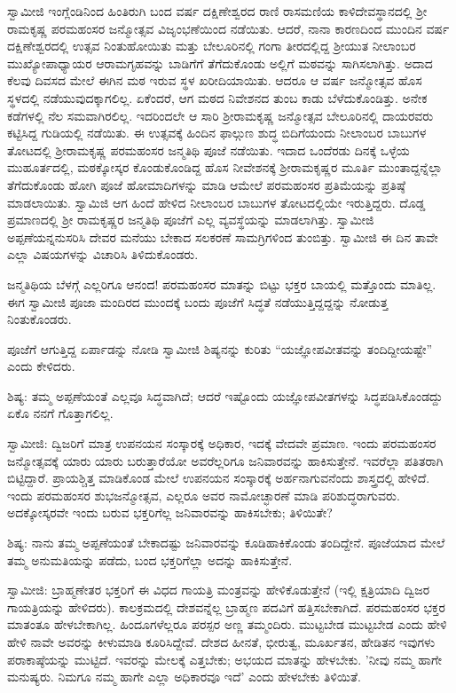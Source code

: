 ಸ್ವಾಮೀಜಿ ಇಂಗ್ಲೆಂಡಿನಿಂದ ಹಿಂತಿರುಗಿ ಬಂದ ವರ್ಷ ದಕ್ಷಿಣೇಶ್ವರದ ರಾಣಿ ರಾಸಮಣಿಯ ಕಾಳಿದೇವಸ್ಥಾನದಲ್ಲಿ ಶ‍್ರೀ ರಾಮಕೃಷ್ಣ ಪರಮಹಂಸರ ಜನ್ಮೋತ್ಸವ ವಿಜೃಂಭಣೆಯಿಂದ ನಡೆಯಿತು. ಆದರೆ, ನಾನಾ ಕಾರಣದಿಂದ ಮುಂದಿನ ವರ್ಷ ದಕ್ಷಿಣೇಶ್ವರದಲ್ಲಿ ಉತ್ಸವ ನಿಂತುಹೋಯಿತು ಮತ್ತು ಬೇಲೂರಿನಲ್ಲಿ ಗಂಗಾ ತೀರದಲ್ಲಿದ್ದ ಶ‍್ರೀಯುತ ನೀಲಾಂಬರ ಮುಖ್ಯೋಪಾಧ್ಯಾಯರ ಆರಾಮಗೃಹವನ್ನು ಬಾಡಿಗೆಗೆ ತೆಗೆದುಕೊಂಡು ಅಲ್ಲಿಗೆ ಮಠವನ್ನು ಸಾಗಿಸಲಾಗಿತ್ತು. ಅದಾದ ಕೆಲವು ದಿವಸದ ಮೇಲೆ ಈಗಿನ ಮಠ ಇರುವ ಸ್ಥಳ ಖರೀದಿಯಾಯಿತು. ಆದರೂ ಆ ವರ್ಷ ಜನ್ಮೋತ್ಸವ ಹೊಸ ಸ್ಥಳದಲ್ಲಿ ನಡೆಯುವುದಕ್ಕಾಗಲಿಲ್ಲ. ಏಕೆಂದರೆ, ಆಗ ಮಠದ ನಿವೇಶನದ ತುಂಬ ಕಾಡು ಬೆಳೆದುಕೊಂಡಿತ್ತು. ಅನೇಕ ಕಡೆಗಳಲ್ಲಿ ನೆಲ ಸಮವಾಗಿರಲಿಲ್ಲ. ಇದರಿಂದಲೇ ಆ ಸಾರಿ ಶ‍್ರೀರಾಮಕೃಷ್ಣ ಜನ್ಮೋತ್ಸವ ಬೇಲೂರಿನಲ್ಲಿ ದಾಯರವರು ಕಟ್ಟಿಸಿದ್ದ ಗುಡಿಯಲ್ಲಿ ನಡೆಯಿತು. ಈ ಉತ್ಸವಕ್ಕೆ ಹಿಂದಿನ ಫಾಲ್ಗುಣ ಶುದ್ಧ ಬಿದಿಗೆಯಂದು ನೀಲಾಂಬರ ಬಾಬುಗಳ ತೋಟದಲ್ಲಿ ಶ‍್ರೀರಾಮಕೃಷ್ಣ ಪರಮಹಂಸರ ಜನ್ಮತಿಥಿ ಪೂಜೆ ನಡೆಯಿತು. ಇದಾದ ಒಂದೆರಡು ದಿನಕ್ಕೆ ಒಳ್ಳೆಯ ಮುಹೂರ್ತದಲ್ಲಿ, ಮಠಕ್ಕೋಸ್ಕರ ಕೊಂಡುಕೊಂಡಿದ್ದ ಹೊಸ ನೀವೇಶನಕ್ಕೆ ಶ‍್ರೀರಾಮಕೃಷ್ಣರ ಮೂರ್ತಿ ಮುಂತಾದ್ದನ್ನೆಲ್ಲಾ ತೆಗೆದುಕೊಂಡು ಹೋಗಿ ಪೂಜೆ ಹೋಮಾದಿಗಳನ್ನು ಮಾಡಿ ಆಮೇಲೆ ಪರಮಹಂಸರ ಪ್ರತಿಮೆಯನ್ನು ಪ್ರತಿಷ್ಠೆ ಮಾಡಲಾಯಿತು. ಸ್ವಾಮಿಜಿ ಆಗ ಹಿಂದೆ ಹೇಳಿದ ನೀಲಾಂಬರ ಬಾಬುಗಳ ತೋಟದಲ್ಲಿಯೇ ಇರುತ್ತಿದ್ದರು. ದೊಡ್ಡ ಪ್ರಮಾಣದಲ್ಲಿ ಶ‍್ರೀ ರಾಮಕೃಷ್ಣರ ಜನ್ಮತಿಥಿ ಪೂಜೆಗೆ ಎಲ್ಲ ವ್ಯವಸ್ಥೆಯನ್ನು ಮಾಡಲಾಗಿತ್ತು. ಸ್ವಾಮೀಜಿ ಅಪ್ಪಣೆಯನ್ನನುಸರಿಸಿ ದೇವರ ಮನೆಯು ಬೇಕಾದ ಸಲಕರಣೆ ಸಾಮಗ್ರಿಗಳಿಂದ ತುಂಬಿತ್ತು. ಸ್ವಾಮೀಜಿ ಈ ದಿನ ತಾವೇ ಎಲ್ಲಾ ವಿಷಯಗಳನ್ನು ವಿಚಾರಿಸಿ ತಿಳಿದುಕೊಂಡರು.

ಜನ್ಮತಿಥಿಯ ಬೆಳಗ್ಗೆ ಎಲ್ಲರಿಗೂ ಆನಂದ! ಪರಮಹಂಸರ ಮಾತನ್ನು ಬಿಟ್ಟು ಭಕ್ತರ ಬಾಯಲ್ಲಿ ಮತ್ತೊಂದು ಮಾತಿಲ್ಲ. ಈಗ ಸ್ವಾಮೀಜಿ ಪೂಜಾ ಮಂದಿರದ ಮುಂದಕ್ಕೆ ಬಂದು ಪೂಜೆಗೆ ಸಿದ್ಧತೆ ನಡೆಯುತ್ತಿದ್ದದ್ದನ್ನು ನೋಡುತ್ತ ನಿಂತುಕೊಂಡರು.

ಪೂಜೆಗೆ ಆಗುತ್ತಿದ್ದ ಏರ್ಪಾಡನ್ನು ನೋಡಿ ಸ್ವಾಮೀಜಿ ಶಿಷ್ಯನನ್ನು ಕುರಿತು “ಯಜ್ಞೋಪವೀತವನ್ನು ತಂದಿದ್ದೀಯಷ್ಟೇ” ಎಂದು ಕೇಳಿದರು.

ಶಿಷ್ಯ: ತಮ್ಮ ಅಪ್ಪಣೆಯಂತೆ ಎಲ್ಲವೂ ಸಿದ್ಧವಾಗಿದೆ; ಆದರೆ ಇಷ್ಟೊಂದು ಯಜ್ಞೋಪವೀತಗಳನ್ನು ಸಿದ್ಧಪಡಿಸಿಕೊಂಡದ್ದು ಏಕೊ ನನಗೆ ಗೊತ್ತಾಗಲಿಲ್ಲ.

ಸ್ವಾಮೀಜಿ: ದ್ವಿಜರಿಗೆ ಮಾತ್ರ ಉಪನಯನ ಸಂಸ್ಕಾರಕ್ಕೆ ಅಧಿಕಾರ, ಇದಕ್ಕೆ ವೇದವೇ ಪ್ರಮಾಣ. ಇಂದು ಪರಮಹಂಸರ ಜನ್ಮೋತ್ಸವಕ್ಕೆ ಯಾರು ಯಾರು ಬರುತ್ತಾರೆಯೋ ಅವರೆಲ್ಲರಿಗೂ ಜನಿವಾರವನ್ನು ಹಾಕಿಸುತ್ತೇನೆ. ಇವರೆಲ್ಲಾ ಪತಿತರಾಗಿ ಬಿಟ್ಟಿದ್ದಾರೆ. ಪ್ರಾಯಶ್ಚಿತ್ತ ಮಾಡಿಕೊಂಡ ಮೇಲೆ ಉಪನಯನ ಸಂಸ್ಕಾರಕ್ಕೆ ಅರ್ಹನಾಗುವನೆಂದು ಶಾಸ್ತ್ರದಲ್ಲಿ ಹೇಳಿದೆ. ಇಂದು ಪರಮಹಂಸರ ಶುಭಜನ್ಮೋತ್ಸವ, ಎಲ್ಲರೂ ಅವರ ನಾಮೋಚ್ಛಾರಣೆ ಮಾಡಿ ಪರಿಶುದ್ಧರಾಗುವರು. ಅದಕ್ಕೋಸ್ಕರವೇ ಇಂದು ಬರುವ ಭಕ್ತರಿಗೆಲ್ಲ ಜನಿವಾರವನ್ನು ಹಾಕಿಸಬೇಕು; ತಿಳಿಯಿತೇ?

ಶಿಷ್ಯ: ನಾನು ತಮ್ಮ ಅಪ್ಪಣೆಯಂತೆ ಬೇಕಾದಷ್ಟು ಜನಿವಾರವನ್ನು ಕೂಡಿಹಾಕಿಕೊಂಡು ತಂದಿದ್ದೇನೆ. ಪೂಜೆಯಾದ ಮೇಲೆ ತಮ್ಮ ಅನುಮತಿಯನ್ನು ಪಡೆದು, ಬಂದ ಭಕ್ತರಿಗೆಲ್ಲಾ ಅದನ್ನು ಹಾಕಿಸುತ್ತೇನೆ.

ಸ್ವಾಮೀಜಿ: ಬ್ರಾಹ್ಮಣೇತರ ಭಕ್ತರಿಗೆ ಈ ವಿಧದ ಗಾಯತ್ರಿ ಮಂತ್ರವನ್ನು ಹೇಳಿಕೊಡುತ್ತೇನೆ (ಇಲ್ಲಿ ಕ್ಷತ್ರಿಯಾದಿ ದ್ವಿಜರ ಗಾಯತ್ರಿಯನ್ನು ಹೇಳಿದರು). ಕಾಲಕ್ರಮದಲ್ಲಿ ದೇಶವನ್ನೆಲ್ಲ ಬ್ರಾಹ್ಮಣ ಪದವಿಗೆ ಹತ್ತಿಸಬೇಕಾಗಿದೆ. ಪರಮಹಂಸರ ಭಕ್ತರ ಮಾತಂತೂ ಹೇಳಬೇಕಾಗಿಲ್ಲ. ಹಿಂದೂಗಳೆಲ್ಲರೂ ಪರಸ್ಪರ ಅಣ್ಣ ತಮ್ಮಂದಿರು. ಮುಟ್ಟಬೇಡ ಮುಟ್ಟಬೇಡ ಎಂದು ಹೇಳಿ ಹೇಳಿ ನಾವೇ ಅವರನ್ನು ಕೀಳುಮಾಡಿ ಕೂರಿಸಿದ್ದೇವೆ. ದೇಶದ ಹೀನತೆ, ಭೀರುತ್ವ, ಮೂರ್ಖತನ, ಹೇಡಿತನ ಇವುಗಳು ಪರಾಕಾಷ್ಠೆಯನ್ನು ಮುಟ್ಟಿದೆ. ಇವರನ್ನು ಮೇಲಕ್ಕೆ ಎತ್ತಬೇಕು; ಅಭಯದ ಮಾತನ್ನು ಹೇಳಬೇಕು. 'ನೀವು ನಮ್ಮ ಹಾಗೇ ಮನುಷ್ಯರು. ನಿಮಗೂ ನಮ್ಮ ಹಾಗೇ ಎಲ್ಲಾ ಅಧಿಕಾರವೂ ಇದೆ' ಎಂದು ಹೇಳಬೇಕು ತಿಳಿಯಿತೆ.

